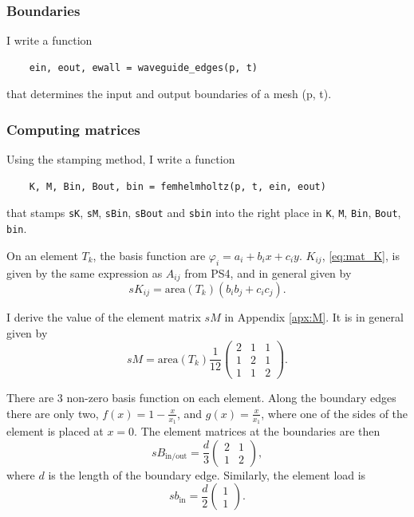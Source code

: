 \documentclass[aps, 12pt]{revtex4}
\begin{document}
\subsubsection{Boundaries}
I write a function \begin{verbatim}
    ein, eout, ewall = waveguide_edges(p, t)
\end{verbatim} that determines the input and output boundaries of a mesh (p, t).

\subsubsection{Computing matrices}
Using the stamping method, I write a function \begin{verbatim}
    K, M, Bin, Bout, bin = femhelmholtz(p, t, ein, eout)
\end{verbatim}
that stamps \texttt{sK}, \texttt{sM}, \texttt{sBin}, \texttt{sBout} and \texttt{sbin} into the right place in \texttt{K}, \texttt{M}, \texttt{Bin}, \texttt{Bout}, \texttt{bin}.

On an element $T_k$, the basis function are $\varphi_i=a_i+b_ix+c_iy$. $K_{ij}$, \eqref{eq:mat_K}, is given by the same expression as $A_{ij}$ from PS4, and in general given by \begin{equation*}
    sK_{ij} = \text{area}(T_k)(b_ib_j + c_ic_j).
\end{equation*}

I derive the value of the element matrix $sM$ in Appendix  \ref{apx:M}. It is in general given by
\begin{equation*}
    sM = \text{area}(T_k)\frac{1}{12}
    \begin{pmatrix}
        2 & 1 & 1 \\ 1 & 2 & 1 \\ 1 & 1 & 2
    \end{pmatrix}.
\end{equation*}

There are 3 non-zero basis function on each element. Along the boundary edges there are only two, $f(x) = 1-\frac{x}{x_1}$, and $g(x)=\frac{x}{x_1}$, where one of the sides of the element is placed at $x=0$. The element matrices at the boundaries are then
\begin{equation*}
    sB_{\text{in/out}} = \frac{d}{3}\begin{pmatrix}
        2 & 1 \\ 1 & 2
    \end{pmatrix},
\end{equation*}
where $d$ is the length of the boundary edge. Similarly, the element load is
\begin{equation*}
    sb_{\text{in}}=\frac{d}{2}\begin{pmatrix}
        1 \\ 1
    \end{pmatrix}.
\end{equation*}
\end{document}

